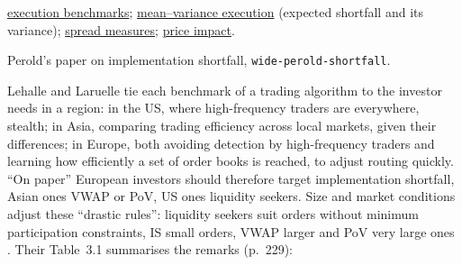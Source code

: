 \begin{qfdefinition}
 \hyperref[def:execution-benchmark]{execution benchmarks}; \hyperref[mod:almgren-chriss-execution]{mean--variance execution} (expected shortfall and its variance); \hyperref[def:spread-measures]{spread measures}; \hyperref[def:price-impact]{price impact}.

 Perold's paper on implementation shortfall, \nolinkurl{wide-perold-shortfall}.

\end{qfdefinition}

\begin{qfmethod}\label{meth:algorithm-benchmark-choice}
 Lehalle and Laruelle tie each benchmark of a trading algorithm to the investor needs in a region: in the US, where high-frequency traders are everywhere, stealth; in Asia, comparing trading efficiency across local markets, given their differences; in Europe, both avoiding detection by high-frequency traders and learning how efficiently a set of order books is reached, to adjust routing quickly. ``On paper'' European investors should therefore target implementation shortfall, Asian ones VWAP or PoV, US ones liquidity seekers. Size and market conditions adjust these ``drastic rules'': liquidity seekers suit orders without minimum participation constraints, IS small orders, VWAP larger and PoV very large ones \citep[sec.~3.4.1, pp.~227--228]{alpha-laruelle}. Their Table~3.1 summarises the remarks (p.~229):

\smallskip
{}
\smallskip


\end{qfmethod}
